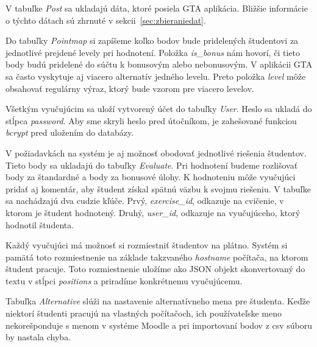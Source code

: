 V tabuľke \textit{Post} sa ukladajú dáta, ktoré posiela GTA aplikácia. Bližšie
informácie o týchto dátach sú zhrnuté v sekcii~\ref{sec:zbieraniedat}.

Do tabuľky \textit{Pointmap} si zapíšeme koľko bodov bude pridelených študentovi
za jednotlivé prejdené levely pri hodnotení. Položka \textit{is\_bonus} nám hovorí,
či tieto body budú pridelené do súčtu k bonusovým alebo nebonusovým. V aplikácii
GTA sa často vyskytuje aj viacero alternatív jedného levelu. Preto položka
\textit{level} môže obsahovať regulárny výraz, ktorý bude vzorom pre viacero
levelov.

Všetkým vyučujúcim sa uloží vytvorený účet do tabuľky \textit{User}.
Heslo sa ukladá do stĺpca \textit{password}. Aby sme skryli heslo pred útočníkom,
je zahešované funkciou \textit{bcrypt} pred uložením do databázy.

V požiadavkách na systém je aj možnosť obodovať jednotlivé riešenia študentov.
Tieto body sa ukladajú do tabuľky \textit{Evaluate}. Pri hodnotení budeme rozlišovať
body za štandardné a body za bonusové úlohy. K hodnoteniu môže vyučujúci pridať aj
komentár, aby študent získal spätnú väzbu k svojmu riešeniu. V tabuľke sa nachádzajú
dva cudzie kľúče. Prvý, \textit{exercise\_id}, odkazuje na cvičenie, v ktorom je študent
hodnotený. Druhý, \textit{user\_id}, odkazuje na vyučujúceho, ktorý hodnotil študenta.

Každý vyučujúci má možnosť si rozmiestniť študentov na plátno. Systém si
pamätá toto rozmiestnenie na základe takzvaného \textit{hostname} počítača,
na ktorom študent pracuje. Toto rozmiestnenie uložíme ako JSON objekt skonvertovaný
do textu v stĺpci \textit{positions} a priradíme konkrétnemu vyučujúcemu.

Tabuľka \textit{Alternative} slúži na nastavenie alternatívneho mena pre študenta.
Keďže niektorí študenti pracujú na vlastných počítačoch, ich používateľske meno
nekorešponduje s menom v systéme Moodle a pri importovaní bodov z csv súboru
by nastala chyba.

